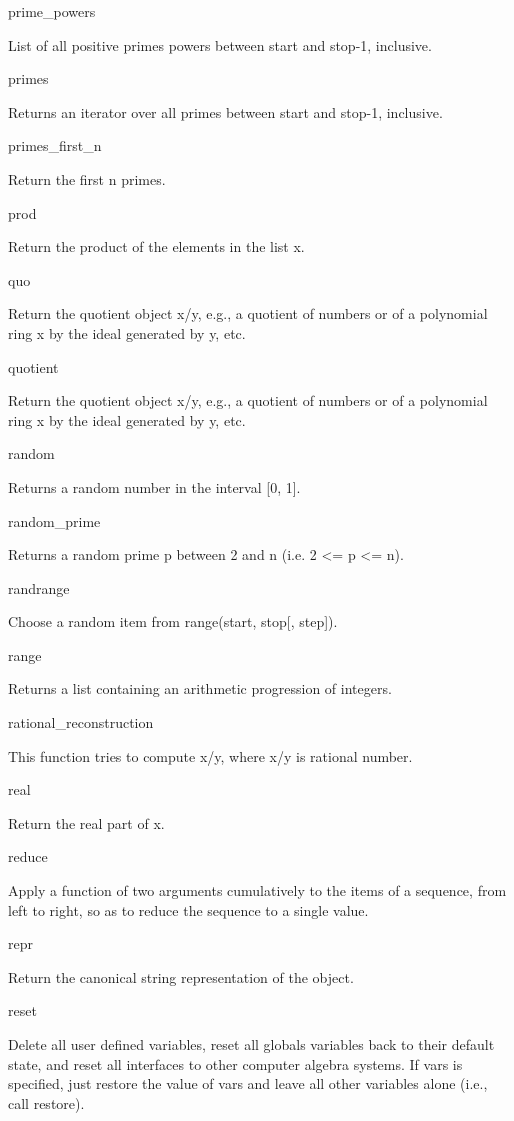 \documentclass[12pt,oneside]{book}
\begin{document}
prime\_powers

List of all positive primes powers between start and stop{}-1, inclusive.

primes

Returns an iterator over all primes between start and stop{}-1, inclusive.

primes\_first\_n

Return the first n primes.

prod

Return the product of the elements in the list x.

quo

Return the quotient object x/y, e.g., a quotient of numbers or of a polynomial ring x by the ideal generated by y, etc.

quotient

Return the quotient object x/y, e.g., a quotient of numbers or of a polynomial ring x by the ideal generated by y, etc.

random

Returns a random number in the interval [0, 1].

random\_prime

Returns a random prime p between 2 and n (i.e. 2 {\textless}= p
{\textless}= n).

randrange

Choose a random item from range(start, stop[, step]).

range

Returns a list containing an arithmetic progression of integers.

rational\_reconstruction

This function tries to compute x/y, where x/y is rational number.

real

Return the real part of x.

reduce

Apply a function of two arguments cumulatively to the items of a sequence, from left to right, so as to reduce the sequence to a single value.

repr

Return the canonical string representation of the object.

reset

Delete all user defined variables, reset all globals variables back to their default state, and reset all interfaces to other computer algebra systems. If vars is specified, just restore the value of vars and leave all other variables alone (i.e., call restore).
\end{document}
